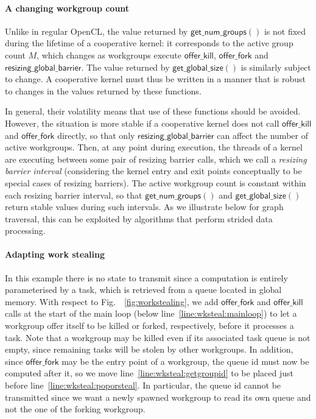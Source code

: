 \documentclass[numbers,nocopyrightspace,10pt]{sigplanconf}
\newcommand{\myfig}{Fig.~}
\newcommand{\offerfork}{\mathsf{offer\_fork}}
\newcommand{\offerkill}{\mathsf{offer\_kill}}
\newcommand{\resizingglobalbarrier}{\mathsf{resizing\_global\_barrier}}
\newcommand{\getnumgroups}{\mathsf{get\_num\_groups}}
\newcommand{\getglobalsize}{\mathsf{get\_global\_size}}
\begin{document}
\paragraph{A changing workgroup count}  Unlike in regular OpenCL,
the value returned by $\getnumgroups()$ is not fixed during the
lifetime of a cooperative kernel: it corresponds to the active group count $M$, which changes as workgroups execute
$\offerkill$, $\offerfork$ and $\resizingglobalbarrier$.  The value returned by $\getglobalsize()$
is similarly subject to change.
A cooperative kernel must thus be written in a manner that is
robust to changes in the values returned by these functions.

In general, their volatility means that use of these functions should be avoided.
However, the situation is more stable if a cooperative kernel does not call
$\offerkill$ and $\offerfork$ directly, so that only $\resizingglobalbarrier$ can affect the number of active
workgroups.  Then, at any point
during execution, the threads of a kernel are executing between some
pair of resizing barrier calls, which we call a \emph{resizing barrier
  interval} (considering the kernel entry and exit points
conceptually to be special cases of resizing barriers).  The active workgroup count is constant within each resizing
barrier interval, so that 
$\getnumgroups()$ and $\getglobalsize()$ return stable values during such intervals.
%
As we illustrate below for graph traversal, this can be exploited by algorithms that perform strided
data processing.


\paragraph{Adapting work stealing}

In this example there is no state to transmit since a computation is
entirely parameterised by a task, which is retrieved from a queue
located in global memory. With respect to \myfig~\ref{fig:workstealing},
we add $\offerfork$ and $\offerkill$ calls at the start of the main loop
(below line~\ref{line:wksteal:mainloop}) to let a workgroup offer itself
to be killed or forked, respectively, before it processes a task.  Note
that a workgroup may be killed even if its associated task queue is not
empty, since remaining tasks will be stolen by other workgroups. In
addition, since $\offerfork$ may be the entry point of a workgroup, the
queue id must now be computed after it, so we move
line~\ref{line:wksteal:getgroupid} to be placed just before
line~\ref{line:wksteal:poporsteal}. In particular, the queue id cannot
be transmitted since we want a newly spawned workgroup to read its own
queue and not the one of the forking workgroup.
\end{document}
